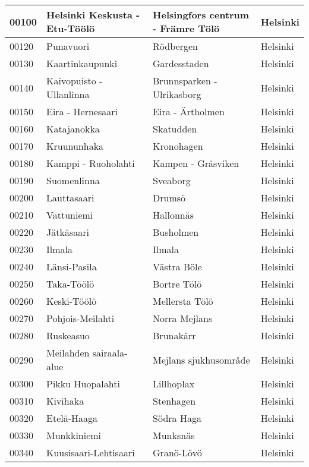 \begin{longtable}{llll}
    00100 & Helsinki Keskusta - Etu-Töölö & Helsingfors centrum - Främre Tölö & Helsinki \\ [0.5 ex] \hline
    00120 & Punavuori & Rödbergen & Helsinki \\ [0.25ex] \hline
    00130 & Kaartinkaupunki & Gardesstaden & Helsinki \\ [0.25ex] \hline
    00140 & Kaivopuisto - Ullanlinna & Brunnsparken - Ulrikasborg & Helsinki \\ [0.25ex] \hline
    00150 & Eira - Hernesaari & Eira - Ärtholmen & Helsinki \\ [0.25ex] \hline
    00160 & Katajanokka & Skatudden & Helsinki \\ [0.25ex] \hline
    00170 & Kruununhaka & Kronohagen & Helsinki \\ [0.25ex] \hline
    00180 & Kamppi - Ruoholahti & Kampen - Gräsviken & Helsinki  \\ [0.25ex] \hline
    00190 & Suomenlinna & Sveaborg & Helsinki \\ [0.25ex] \hline
    00200 & Lauttasaari & Drumsö & Helsinki \\ [0.25ex] \hline
    00210 & Vattuniemi & Hallonnäs & Helsinki \\ [0.25ex] \hline
    00220 & Jätkäsaari & Busholmen & Helsinki \\ [0.25ex] \hline
    00230 & Ilmala & Ilmala & Helsinki \\ [0.25ex] \hline
    00240 & Länsi-Pasila & Västra Böle & Helsinki \\ [0.25ex] \hline
    00250 & Taka-Töölö & Bortre Tölö & Helsinki \\ [0.25ex] \hline
    00260 & Keski-Töölö & Mellersta Tölö & Helsinki \\ [0.25ex] \hline
    00270 & Pohjois-Meilahti & Norra Mejlans & Helsinki \\ [0.25ex] \hline
    00280 & Ruskeasuo & Brunakärr & Helsinki \\ [0.25ex] \hline
    00290 & Meilahden sairaala-alue & Mejlans sjukhusområde & Helsinki \\ [0.25ex] \hline
    00300 & Pikku Huopalahti & Lillhoplax & Helsinki \\ [0.25ex] \hline
    00310 & Kivihaka & Stenhagen & Helsinki \\ [0.25ex] \hline
    00320 & Etelä-Haaga & Södra Haga & Helsinki \\ [0.25ex] \hline
    00330 & Munkkiniemi & Munksnäs & Helsinki \\ [0.25ex] \hline
    00340 & Kuusisaari-Lehtisaari & Granö-Lövö & Helsinki \\ [0.25ex] \hline

\end{longtable}
